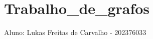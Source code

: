 \chapter{Trabalho\+\_\+de\+\_\+grafos}
\hypertarget{md_README}{}\label{md_README}
\label{md_README_autotoc_md0}%
%


Aluno\+: Lukas Freitas de Carvalho -\/ 202376033 